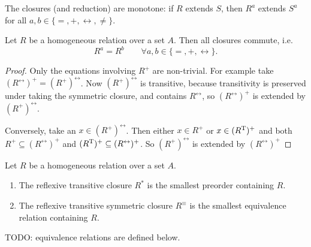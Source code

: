 \begin{lemma}
The closures (and reduction) are monotone: if $R$ extends $S$, then $R^a$ extends $S^a$ for all $a,b\in\{=,+,\leftrightarrow,\neq\}$.
\end{lemma}

\begin{lemma}
Let $R$ be a homogeneous relation over a set $A$. Then all closures commute, i.e.
\[ R^a = R^b \qquad \forall a,b\in\{=,+,\leftrightarrow\}. \]
\end{lemma}
\begin{proof}
Only the equations involving $R^+$ are non-trivial. For example take $(R^\leftrightarrow)^+ = (R^+)^\leftrightarrow$. Now $(R^+)^\leftrightarrow$ is transitive, because transitivity is preserved under taking the symmetric closure, and contains $R^\leftrightarrow$, so $(R^\leftrightarrow)^+$ is extended by $(R^+)^\leftrightarrow$.

Conversely, take an $x\in (R^+)^\leftrightarrow$. Then either $x\in R^+$ or $x\in (R^{\mathrm{T}})^+$ and both $R^+\subseteq (R^\leftrightarrow)^+$ and $(R^{\mathrm{T}})^+\subseteq (R^\leftrightarrow)^+$. So $(R^+)^\leftrightarrow$ is extended by $(R^\leftrightarrow)^+$
\end{proof}

\begin{lemma}
Let $R$ be a homogeneous relation over a set $A$.
\begin{enumerate}
\item The reflexive transitive closure $R^*$ is the smallest preorder containing $R$.
\item The reflexive transitive symmetric closure $R^\equiv$ is the smallest equivalence relation containing $R$.
\end{enumerate}
\end{lemma}
TODO: equivalence relations are defined below.

